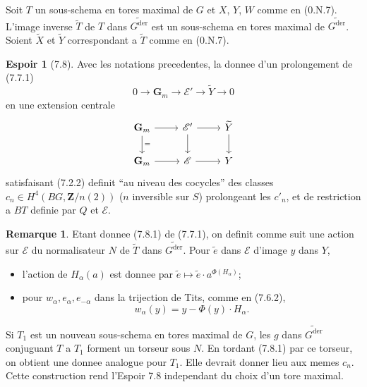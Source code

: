 \documentclass[11pt,a4paper]{article}
\theoremstyle{plain}
\theoremstyle{definition}
\newtheorem{remark}[theorem]{Remarque}
\newtheorem{espoir}[theorem]{Espoir}
\DeclareMathOperator{\der}{der}
\begin{document}
Soit $T$ un sous-schema en tores maximal de $G$ et $X$, $Y$, $W$ comme en (0.N.7). L'image inverse $\widetilde{T}$ de $T$ dans $\widetilde{G^{\der}}$ est un sous-schema en tores maximal de $\widetilde{G^{\der}}$. Soient $\widetilde{X}$ et $\widetilde{Y}$ correspondant a $\widetilde{T}$ comme en (0.N.7).

\begin{espoir}[7.8]\label{7.8}
Avec les notations precedentes, la donnee d'un prolongement de (7.7.1)
\begin{equation}\label{7.7.1}
0 \to \mathbf{G}_m \to \mathscr{E}' \to \widetilde{Y} \to 0
\end{equation}
en une extension centrale
\[
\begin{tikzcd}
\mathbf{G}_m \arrow{r} \arrow{d}{=} & \mathscr{E}' \arrow{r} \arrow{d} & \widetilde{Y} \arrow{d} \\
\mathbf{G}_m \arrow{r} & \mathscr{E} \arrow{r} & Y
\end{tikzcd}
\]
satisfaisant (7.2.2) definit ``au niveau des cocycles'' des classes $c_n \in H^4(BG, \mathbf{Z}/n(2))$ ($n$ inversible sur $S$) prolongeant les $c'_n$, et de restriction a $BT$ definie par $Q$ et $\mathscr{E}$.
\end{espoir}

\begin{remark}\label{7.9}
Etant donnee (7.8.1) de (7.7.1), on definit comme suit une action sur $\mathscr{E}$ du normalisateur $N$ de $\widetilde{T}$ dans $\widetilde{G^{\der}}$. Pour $\tilde{e}$ dans $\mathscr{E}$ d'image $y$ dans $Y$,
\begin{itemize}
\item[a)] l'action de $H_\alpha(a)$ est donnee par $\tilde{e} \mapsto \tilde{e} \cdot a^{\Phi(H_\alpha)}$;
\item[b)] pour $w_\alpha, e_\alpha, e_{-\alpha}$ dans la trijection de Tits, comme en (7.6.2),
\[
w_\alpha(y) = y - \Phi(y) \cdot H_\alpha.
\]
\end{itemize}
Si $T_1$ est un nouveau sous-schema en tores maximal de $G$, les $g$ dans $\widetilde{G^{\der}}$ conjuguant $T$ a $T_1$ forment un torseur sous $N$. En tordant (7.8.1) par ce torseur, on obtient une donnee analogue pour $T_1$. Elle devrait donner lieu aux memes $c_n$. Cette construction rend l'Espoir 7.8 independant du choix d'un tore maximal.
\end{remark}
\end{document}
